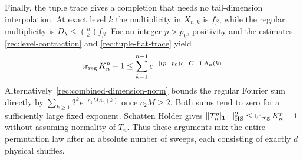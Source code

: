 Finally, the tuple trace gives a completion that needs no tail-dimension
interpolation.  At exact level $k$ the multiplicity in $X_{n,k}$ is
$f_\beta$, while the regular multiplicity is
$D_\lambda\le{n\choose k}f_\beta$.  For an integer $p>p_0$, positivity and the
estimates \eqref{rec:level-contraction} and \eqref{rec:tuple-flat-trace} yield
\begin{equation}\label{rec:tuple-regular-completion}
 \operatorname{tr}_{\rm reg}K_n^p-1
 \le\sum_{k=1}^{n-1}
 e^{-[(p-p_0)c-C-1]\Lambda_n(k)}.
\end{equation}
Alternatively~\eqref{rec:combined-dimension-norm} bounds the regular
Fourier sum directly by $\sum_{k\ge1}2^k e^{-c_1M\Lambda_n(k)}$ once
$c_2M\ge2$.  Both sums tend to zero for a sufficiently large fixed
exponent.  Schatten H\"older gives
$\|T_n^p|_{\mathbf1^\perp}\|_{\mathrm{HS}}^2\le\operatorname{tr}_{\rm reg}K_n^p-1$ without
assuming normality of $T_n$.  Thus these arguments mix the entire
permutation law after an absolute number of sweeps, each consisting
of exactly $d$ physical shuffles.

